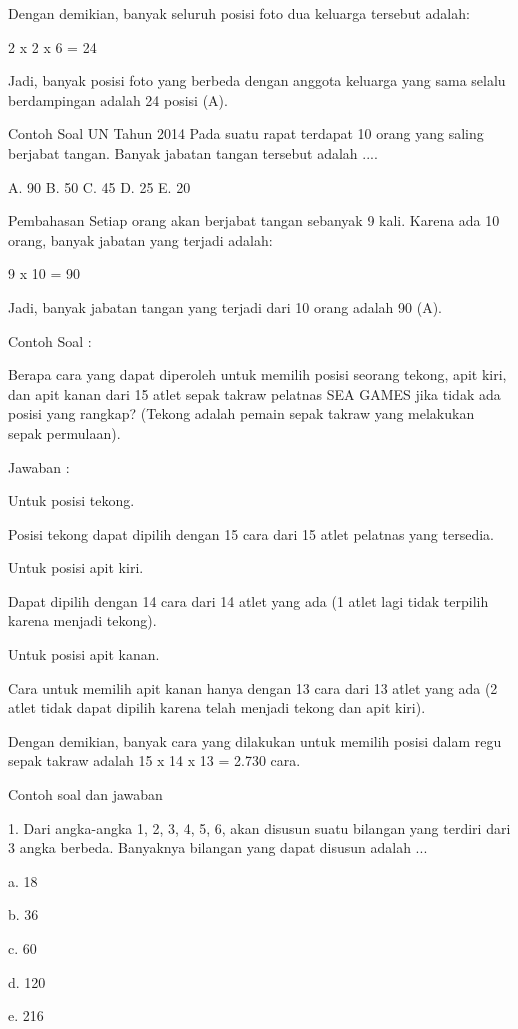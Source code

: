 \documentclass[11pt,fleqn]{book} %
\begin{document}
Dengan demikian, banyak seluruh posisi foto dua keluarga tersebut adalah:

2 x 2 x 6 = 24

Jadi, banyak posisi foto yang berbeda dengan anggota keluarga yang sama selalu berdampingan adalah 24 posisi (A). 

Contoh Soal UN Tahun 2014 
Pada suatu rapat terdapat 10 orang yang saling berjabat tangan. Banyak jabatan tangan tersebut adalah ....

A.   90
B.   50
C.   45
D.   25
E.   20


Pembahasan
Setiap orang akan berjabat tangan sebanyak 9 kali. Karena ada 10 orang, banyak jabatan yang terjadi adalah:

9 x 10 = 90

Jadi, banyak jabatan tangan yang terjadi dari 10 orang  adalah 90 (A).


Contoh Soal :

Berapa cara yang dapat diperoleh untuk memilih posisi seorang tekong, apit kiri, dan apit kanan dari 15 atlet sepak takraw pelatnas SEA GAMES jika tidak ada posisi yang rangkap? (Tekong adalah pemain sepak takraw yang melakukan sepak permulaan).

Jawaban :

Untuk posisi tekong.

Posisi tekong dapat dipilih dengan 15 cara dari 15 atlet pelatnas yang tersedia.

Untuk posisi apit kiri.

Dapat dipilih dengan 14 cara dari 14 atlet yang ada (1 atlet lagi tidak terpilih karena menjadi tekong).

Untuk posisi apit kanan.

Cara untuk memilih apit kanan hanya dengan 13 cara dari 13 atlet yang ada (2 atlet tidak dapat dipilih karena telah menjadi tekong dan apit kiri).

Dengan demikian, banyak cara yang dilakukan untuk memilih posisi dalam regu sepak takraw adalah 15 x 14 x 13 = 2.730 cara.

 
Contoh soal dan jawaban

1. Dari angka-angka 1, 2, 3, 4, 5, 6, akan disusun suatu bilangan yang terdiri dari 3 angka berbeda. Banyaknya bilangan yang dapat disusun adalah ... 

a.	18

b.	36

c.	60

d.	120

e.	216
\end{document}
